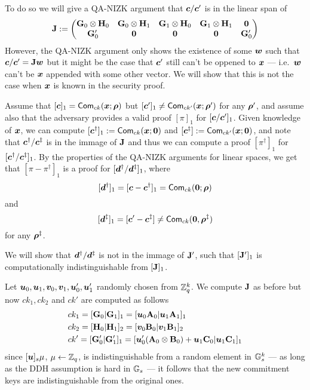 To do so we will give a QA-NIZK argument that ${\boldsymbol{c}}/{\boldsymbol{c}}'$ is in the linear span of
$$
\mathbf{{J}}:=
\begin{pmatrix}
\mathbf{{G}}_0\otimes\mathbf{{H}}_0 & \mathbf{{G}}_0\otimes\mathbf{{H}}_1 & \mathbf{{G}}_1\otimes\mathbf{{H}}_0& \mathbf{{G}}_1\otimes\mathbf{{H}}_1 & \mathbf{{0}}\\
\mathbf{{G}}'_0 & \mathbf{{0}} & \mathbf{{0}} & \mathbf{{0}} & \mathbf{{G}}'_0 
\end{pmatrix}
$$
However, the QA-NIZK argument only shows the existence of some ${\boldsymbol{w}}$ such that ${\boldsymbol{c}}/{\boldsymbol{c}}' = \mathbf{{J}}{\boldsymbol{w}}$ but it might be the case that ${\boldsymbol{c}}'$ still can't be oppened to ${\boldsymbol{x}}$ --- i.e.~${\boldsymbol{w}}$ can't be ${\boldsymbol{x}}$ appended with some other vector. We will show that this is not the case when ${\boldsymbol{x}}$ is known in the security proof.

Assume that $[{\boldsymbol{c}}]_1 = \mathsf{Com}_{ck}({\boldsymbol{x}};{\boldsymbol{\rho}})$ but $[{\boldsymbol{c}}']_1\neq \mathsf{Com}_{ck'}({\boldsymbol{x}};{\boldsymbol{\rho}}')$ for any ${\boldsymbol{\rho}}'$, and assume also that the adversary provides a valid proof $[\pi]_1$ for $[{\boldsymbol{c}}/{\boldsymbol{c}}']_1$. Given knowledge of ${\boldsymbol{x}}$, we can compute $[{\boldsymbol{c}}^\dag]_1:=\mathsf{Com}_{ck}({\boldsymbol{x}};{\boldsymbol{0}})$ and $[{\boldsymbol{c}}^\ddag]:=\mathsf{Com}_{ck'}({\boldsymbol{x}};{\boldsymbol{0}})$, and note that ${\boldsymbol{c}}^\dag/{\boldsymbol{c}}^\ddag$ is in the immage of $\mathbf{{J}}$ and thus we can compute a proof $[\pi^\dag]_1$ for $[{\boldsymbol{c}}^\dag/{\boldsymbol{c}}^\ddag]_1$. By the properties of the QA-NIZK arguments for linear spaces, we get that $[\pi-\pi^\dag]_1$ is a proof for $[{\boldsymbol{d}}^\dag/{\boldsymbol{d}}^\ddag]_1$, where
$$[{\boldsymbol{d}}^\dag]_1=[{\boldsymbol{c}}-{\boldsymbol{c}}^\dag]_1= \mathsf{Com}_{ck}({\boldsymbol{0}};{\boldsymbol{\rho}})$$ and 
$$[{\boldsymbol{d}}^\ddag]_1 = [{\boldsymbol{c}}'-{\boldsymbol{c}}^\ddag]\neq\mathsf{Com}_{ck}({\boldsymbol{0}},{\boldsymbol{\rho}}^\ddag)$$ for any ${\boldsymbol{\rho}}^\ddag$.

We will show that ${\boldsymbol{d}}^\dag/ {\boldsymbol{d}}^\ddag$ is not in the immage of $\mathbf{{J}}'$, such that $[\mathbf{{J}}']_1$ is computationally indistinguishable from $[\mathbf{{J}}]_1$.

Let ${\boldsymbol{u}}_0,{\boldsymbol{u}}_1,{\boldsymbol{v}}_0,{\boldsymbol{v}}_1,{\boldsymbol{u}}'_0,{\boldsymbol{u}}'_1$ randomly chosen from $\mathbb{Z}_q^k$. We compute $\mathbf{{J}}$ as before but now $ck_1,ck_2$ and $ck'$ are computed as follows
\begin{align}
&ck_1 = [\mathbf{{G}}_0|\mathbf{{G}}_1]_1 = [{\boldsymbol{u}}_0\mathbf{{A}}_{0}|{\boldsymbol{u}}_1\mathbf{{A}}_1]_1 \nonumber \\
&ck_2 = [\mathbf{{H}}_0|\mathbf{{H}}_1]_2 = [{\boldsymbol{v}}_0\mathbf{{B}}_{0}|{\boldsymbol{v}}_1\mathbf{{B}}_1]_2 \nonumber \\
&ck' =  [\mathbf{{G}}'_0|\mathbf{{G}}'_1]_1 = [{\boldsymbol{u}}'_0(\mathbf{{A}}_0\otimes\mathbf{{B}}_0) + {\boldsymbol{u}}_1\mathbf{{C}}_0|{\boldsymbol{u}}_1\mathbf{{C}}_1]_1 \label{eq:ck-dist}
\end{align}
since $[{\boldsymbol{u}}]_s\mu$, $\mu\gets \mathbb{Z}_q$, is indistinguishable from a random element in $\mathbb{G}_s^k$ --- as long as the DDH assumption is hard in $\mathbb{G}_s$ --- it follows that the new commitment keys are indistinguishable from the original ones.

